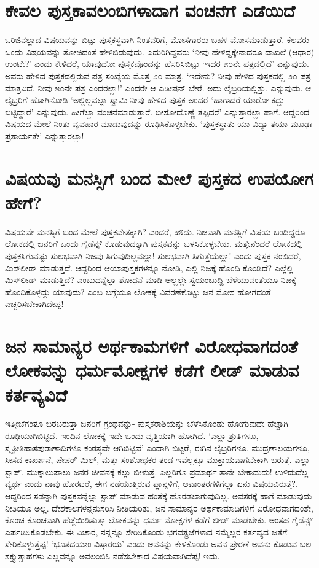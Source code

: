 \section*{ಕೇವಲ ಪುಸ್ತಕಾವಲಂಬಿಗಳಾದಾಗ ವಂಚನೆಗೆ ಎಡೆಯಿದೆ}

ಒರಿಜಿನಲ್ಲಾದ ವಿಷಯವನ್ನು ಬಿಟ್ಟು ಪುಸ್ತಕಸ್ಥವಾಗಿ ನಿಂತವರಿಗೆ, ಮೋಸಗಾರರು ಬಹಳ ಮೋಸಮಾಡುತ್ತಾರೆ. ಕೆಲವರು ಒಂದು ವಿಷಯವನ್ನು ತೋಚಿದಂತೆ ಹೇಳಿಬಿಡುವುದು. ಎದುರಿಗಿದ್ದವರು `ನೀವು ಹೇಳಿದ್ದಕ್ಕೇನಾದರೂ ದಾಖಲೆ (ಆಧಾರ) ಉಂಟೇ?' ಎಂದು ಕೇಳಿದರೆ, ಯಾವುದೋ ಪುಸ್ತಕವೊಂದನ್ನು ಹೆಸರಿಸಿಬಿಟ್ಟು `ಇದರ ೫೦ನೇ ಪತ್ರದಲ್ಲಿದೆ' ಎನ್ನುವುದು. ಅವರು ಹೇಳಿದ ಪುಸ್ತಕದಲ್ಲಿರುವ ಪತ್ರ ಸಂಖ್ಯೆಯ ಮೊತ್ತ ೨೦ ಮಾತ್ರ. `ಇದೇನು? ನೀವು ಹೇಳಿದ ಪುಸ್ತಕದಲ್ಲಿ ೨೦ ಪತ್ರ ಮಾತ್ರವಿದೆ. ನೀವು ೫೦ನೇ ಪತ್ರ ಎಂದರಲ್ಲಾ!' ಎಂದರೇ ಆ ಎಡೀಷನ್ ಬೇರೆ. ಅದು ಲೈಬ್ರರಿಯಲ್ಲಿತ್ತು, ಎನ್ನುವುದು. ಆ ಲೈಬ್ರರಿಗೆ ಹೋಗಿನೋಡಿ `ಅಲ್ಲಿಲ್ಲವಲ್ಲಾ ಸ್ವಾಮಿ ನೀವು ಹೇಳಿದ ಪುಸ್ತಕ ಅಂದರೆ `ಹಾಗಾದರೆ ಯಾರೋ ಕದ್ದು ಬಿಟ್ಟಿದ್ದಾರೆ' ಎನ್ನುವುದು. ಹೀಗೆಲ್ಲಾ ವಂಚನೆಮಾಡುತ್ತಾರೆ. ಬೀಸೋದೊಣ್ಣೆ ತಪ್ಪಿದರೆ' ಎನ್ನುತ್ತಾರಲ್ಲಾ ಹಾಗೆ. ಆದ್ದರಿಂದ ವಿಷಯದ ಮೇಲೆ ನಿಂತು ವ್ಯವಹಾರ ಮಾಡುವುದನ್ನು ರೂಢಿಸಿಕೊಳ್ಳಬೇಕು. `ಪುಸ್ತಕಸ್ಥಾತು ಯಾ ವಿದ್ಯಾ\label{114} ತಯಾ ಮೂಢಃ ಪ್ರತಾರ್ಯತೇ' ಎನ್ನುತ್ತಾರಲ್ಲಾ!

\section*{ವಿಷಯವು ಮನಸ್ಸಿಗೆ ಬಂದ ಮೇಲೆ ಪುಸ್ತಕದ ಉಪಯೋಗ ಹೇಗೆ?}

ವಿಷಯವೇ ಮನಸ್ಸಿಗೆ ಬಂದ ಮೇಲೆ ಪುಸ್ತಕವೇತಕ್ಕಾಗಿ? ಎಂದರೆ, ಹೌದು. ನಿಜವಾಗಿ ಮನಸ್ಸಿಗೆ ವಿಷಯ ಬಂದಿದ್ದರೂ ಲೋಕದಲ್ಲಿ ಜನರಿಗೆ ಒಂದು ಗೈಡೆನ್ಸ್  ಕೊಡುವುದಕ್ಕಾಗಿ ಪುಸ್ತಕವನ್ನು ಬಳಸಿಕೊಳ್ಳಬೇಕು. ಮತ್ತೇನೆಂದರೆ ಲೋಕದಲ್ಲಿ ಪುಸ್ತಕಸಿಗುವಷ್ಟು ಸುಲಭವಾಗಿ ನಿಜವು ಸಿಗುವುದಿಲ್ಲವಲ್ಲಾ! ಸುಲಭವಾಗಿ ಸಿಗುತ್ತೆಯೆಲ್ಲಾ! ಎಂದು ಪುಸ್ತಕ ನಂಬಿದರೆ, ಮಿಸ್‌ಲೀಡ್ ಮಾಡುತ್ತದೆ. ಆದ್ದರಿಂದ ಆಯಾಪುಸ್ತಕಗಳನ್ನೂ ನೋಡಿ, ಎಲ್ಲಿ ನಿಜಕ್ಕೆ ಹೊಂದಿ ಕೊಂಡಿದೆ? ಎಲ್ಲೆಲ್ಲಿ ಮಿಸ್‌ಲೀಡ್ ಮಾಡುತ್ತಿದೆ? ಎಂಬುದನ್ನೆಲ್ಲಾ ಶೋಧನೆ ಮಾಡಿ ಅಲ್ಲಲ್ಲೇ ಸ್ವಯಂಬುದ್ದಿ ಬೆಳೆಯುವಂತೆಯೂ ನಿಜಕ್ಕೆ ಹೊಂದಿಕೊಳ್ಳದ್ದು ಯಾವುದು? ಎಂಬ ಬಗ್ಗೆಯೂ ಲೋಕಕ್ಕೆ ವಿವರಣೆಕೊಟ್ಟು ಜನ ಮೋಸ ಹೋಗದಂತೆ ಎಚ್ಚರಿಸಬೇಕಾಗಿದೇಪ್ಪ!

\section*{ಜನ ಸಾಮಾನ್ಯರ ಅರ್ಥಕಾಮಗಳಿಗೆ ವಿರೋಧವಾಗದಂತೆ ಲೋಕವನ್ನು ಧರ್ಮಮೋಕ್ಷಗಳ ಕಡೆಗೆ ಲೀಡ್ ಮಾಡುವ ಕರ್ತವ್ಯವಿದೆ}

ಇತ್ತೀಚೆಗಂತೂ ಬರಬರುತ್ತಾ ಜನರಿಗೆ ಗ್ರಂಥವನ್ನು- ಪುಸ್ತಕರಾಶಿಯನ್ನು ಬೆಳೆಸಿಕೊಂಡು ಹೋಗುವುದೇ ಹೆಚ್ಚಾಗಿ ರೂಢಿಯಾಗಿಬಿಟ್ಟಿದೆ. ಇಂದಿನ ಲೋಕಕ್ಕೆ ಇದೇ ಒಂದು  ವೃತ್ತಿಯಾಗಿ ಹೋಗಿದೆ. `ಎಲ್ಲಾ ಶ್ರುತಿಗಳೂ, ಸ್ಮೃತೀತಿಹಾಸಪುರಾಣಾದಿಗಳೂ ಕಂಠಸ್ಥವೇ ಆಗಿಬಿಟ್ಟಿವೆ' ಎಂದಾಗಿ ಬಿಟ್ಟರೆ, ಈಗಿನ ಲೈಬ್ರರಿಗಳೂ, ಮುದ್ರಣಾಲಯಗಳೂ, ಸೀಸದ ಕಾರ್ಖಾನೆ, ಪೇಪರ್ ಮಿಲ್, ಮತ್ತು ಸಂಶೋಧಕರ ತಂಡ ಇವೆಲ್ಲಕ್ಕೂ ಮುಕ್ತಾಯವಾಗಬೇಕಾಗಿ ಬರುತ್ತೆ. ಎಲ್ಲಾ ಸ್ಟಾಪ್. ಮುಕ್ಕಾಲುಪಾಲು ಜನರ ಜೀವನಕ್ಕೆ ಕಲ್ಲು ಬೀಳುತ್ತೆ. ಎಲ್ಲರಿಗೂ ಪ್ರಮಾರ್ಥ ತಾನೇ ಬೇಕಾದುದು! ಉಳಿದುದೆಲ್ಲ ವ್ಯರ್ಥ ಎಂದು ನಾವು ಹೊರಟರೆ, ಈಗ ನಡೆಯುತ್ತಿರುವ ಪ್ಲಾನ್ಗಳಿಗೆ, ಅವಾಂತರಗಳಿಗೆಲ್ಲಾ ಏನು ವಿಷಯವಿರುತ್ತೆ?. ಆದ್ದರಿಂದ ಸಡನ್ನಾಗಿ ಪುಸ್ತಕವನ್ನೆಲ್ಲಾ ಸ್ಟಾಪ್ ಮಾಡುವ ಹಂತೆಕ್ಕೆ ಹೊರಡಲಾಗುವುದಿಲ್ಲ. ಅವಸರಕ್ಕೆ ಹಾಗೆ ಮಾಡುವುದು ನೀತಿಯೂ ಅಲ್ಲ. ದೇಶಕಾಲಗಳನ್ನನುಸರಿಸಿ ನೀತಿಯರಿತು, ಜನ ಸಾಮಾನ್ಯರ ಅರ್ಥಕಾಮಾದಿಗಳಿಗೆ ವಿರೋಧವಾಗದಂತೇ, ಕೊಂಚ ಕೊಂಚವಾಗಿ ಹೆಜ್ಜೆಯಿಡಿಸುತ್ತಾ ಲೋಕವನ್ನು ಧರ್ಮ ಮೋಕ್ಷಗಳ ಕಡೆಗೆ ಲೀಡ್ ಮಾಡಬೇಕು. ಅಂತಹ ಗೈಡೆನ್ಸ್  ಎರ್ಪಡಿಸಿಕೊಡಬೇಕು. ಈ ವಿಚಾರ, ನನ್ನನ್ನೂ ಸೇರಿಸಿಕೊಂಡು ಭಗವತ್ಪ್ರಜೆಗಳಾದ ನಮ್ಮೆಲ್ಲರ ಕರ್ತವ್ಯದ ಜತೆಗೆ ಸೇರಿಕೊಳ್ಳುತ್ತೆಪ್ಪ! `ಭೂತದಯಾಂ ವಿಸ್ತಾರಯ' ಎಂದು ಅವನನ್ನು ಕೇಳಿಕೊಂಡು ಅವನ ಪ್ರೇರಣೆ ಅವನು ಕೊಡುವ ಬಲ ಶಕ್ತ್ಯುತ್ಸಾಹಗಳು ಎಲ್ಲವನ್ನೂ ಅವಲಂಬಿಸಿ ನಡೆಸಬೇಕಾದ ವಿಷಯವಾಗಿದೆಪ್ಪ! ಇದು.


